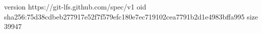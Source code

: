 version https://git-lfs.github.com/spec/v1
oid sha256:75d38cdbeb277917e52f7f579efc180e7ec719102cea7791b2d1e4983bffa995
size 39947
